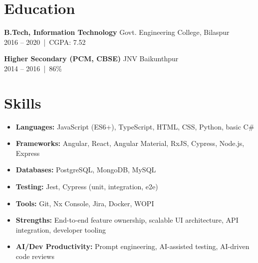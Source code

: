 \documentclass[a4paper,10pt]{article}
\begin{document}
\section*{Education}
\textbf{B.Tech, Information Technology} \hfill Govt. Engineering College, Bilaspur \\
2016 -- 2020 \,|\, CGPA: 7.52

\textbf{Higher Secondary (PCM, CBSE)} \hfill JNV Baikunthpur \\
2014 -- 2016 \,|\, 86\%

\section*{Skills}
\begin{itemize}
    \item \textbf{Languages:} JavaScript (ES6+), TypeScript, HTML, CSS, Python, basic C\#
    \item \textbf{Frameworks:} Angular, React, Angular Material, RxJS, Cypress, Node.js, Express
    \item \textbf{Databases:} PostgreSQL, MongoDB, MySQL
    \item \textbf{Testing:} Jest, Cypress (unit, integration, e2e)
    \item \textbf{Tools:} Git, Nx Console, Jira, Docker, WOPI
    \item \textbf{Strengths:} End-to-end feature ownership, scalable UI architecture, API integration, developer tooling
    \item \textbf{AI/Dev Productivity:} Prompt engineering, AI-assisted testing, AI-driven code reviews
\end{itemize}
\end{document}
